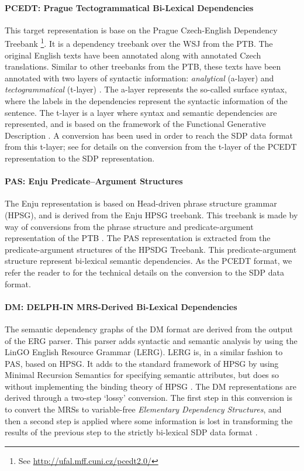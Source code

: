 \paragraph{PCEDT: Prague Tectogrammatical Bi-Lexical Dependencies} This target representation is base on the Prague Czech-English Dependency Treebank \cite{PCEDT}\footnote{See \url{http://ufal.mff.cuni.cz/pcedt2.0/}}. It is a dependency treebank over the WSJ from the PTB. The original English texts have been annotated along with annotated Czech translations. Similar to other treebanks from the PTB, these texts have been annotated with two layers of syntactic information: \textit{analytical} (a-layer) and \textit{tectogrammatical} (t-layer) \cite{Oepen:14}. The a-layer represents the so-called surface syntax, where the labels in the dependencies represent the syntactic information of the sentence. The t-layer is a layer where syntax and semantic dependencies are represented, and is based on the framework of the Functional Generative Description \cite{Sgall:86}. A conversion has been used in order to reach the SDP data format from this t-layer; see  for details on the conversion from the t-layer of the PCEDT representation to the SDP representation.

\paragraph{PAS: Enju Predicate–Argument Structures} The Enju representation is based on Head-driven phrase structure grammar (HPSG), and is derived from the Enju HPSG treebank. This treebank is made by way of conversions from the phrase structure and predicate-argument representation of the PTB \cite{Oepen:14}. The PAS representation is extracted from the predicate-argument structures of the HPSDG Treebank. This predicate-argument structure represent bi-lexical semantic dependencies. As the PCEDT format, we refer the reader to  for the technical details on the conversion to the SDP data format.

\paragraph{DM: DELPH-IN MRS-Derived Bi-Lexical Dependencies} The semantic dependency graphs of the DM format are derived from the output of the ERG parser. This parser adds syntactic and semantic analysis by using the LinGO English Resource Grammar (LERG). LERG is, in a similar fashion to PAS, based on HPSG. It adds to the standard framework of HPSG by using Minimal Recursion Semantics for specifying semantic attributes, but does so without implementing the binding theory of HPSG \cite{Flickinger:00}. The DM representations are derived through a two-step `lossy' conversion. The first step in this conversion is to convert the MRSs to variable-free \textit{Elementary Dependency Structures}, and then a second step is applied where some information is lost in transforming the results of the previous step to the strictly bi-lexical SDP data format \cite{Miyao:14}.

